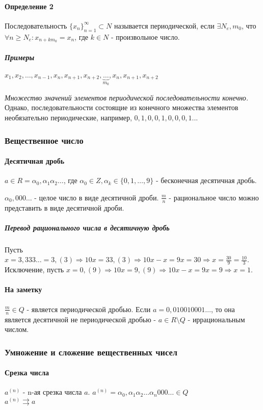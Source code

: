 \documentclass[10pt]{article}
\begin{document}
				\paragraph{Определение 2} Последовательность $\{x_n\}_{n=1}^\infty \subset N$ называется периодической, если $\exists N_e, m_0$, что $\forall n \ge N_e : x_{n+km_0} = x_n$, где $k \in N$ - произвольное число.
				\subparagraph{Примеры} $x_1, x_2, \dots, x_{n-1}, x_n, x_{n+1}, x_{n+2}, \underbrace{\dots}_{m_0}, x_n, x_{n+1}, x_{n+2}$
				
				\textit{Множество значений элементов периодической последовательности конечно.} Однако, последовательности состоящие из конечного множества элементов необязательно периодические, например, $0,1,0,0,1,0,0,0,1...$
			\subsubsection{Вещественное число}
			\paragraph{Десятичная дробь}
			$a \in R = \alpha_0, \alpha_1\alpha_2\dots$, где $\alpha_0 \in Z, \alpha_k \in \{0, 1, \dots, 9\}$ - бесконечная десятичная дробь.
			
			$\alpha_0,000\dots$ - целое число в виде десятичной дроби. $\frac{m}{n}$ - рациональное число можно представить в виде десятичной дроби.
			
			\subparagraph{Перевод рационального числа в десятичную дробь}
			Пусть $x = 3,333\dots = 3,(3) \Rightarrow 10x = 33,(3) \Rightarrow 10x - x = 9x = 30 \Rightarrow x = \frac{30}{9} = \frac{10}{3}$. Исключение, пусть $x = 0,(9) \Rightarrow 10x = 9,(9) \Rightarrow 10x - x = 9x = 9 \Rightarrow x = 1$.
			
			\paragraph{На заметку}
			$\frac{m}{n} \in Q$ - является периодической дробью. Если $a = 0,010010001\dots$, то она является десятичной не периодической дробью - $a \in R\setminus Q$ - иррациональным числом.
			
			\subsubsection{Умножение и сложение вещественных чисел}
			
			\paragraph{Срезка числа}
			$a^{(n)}$ - n-ая срезка числа $a$. $a^{(n)} = \alpha_0, \alpha_1\alpha_2\dots\alpha_n000\dots \in Q$ \\
			$a^{(n)} \rightrightarrows a$
								
\end{document}
